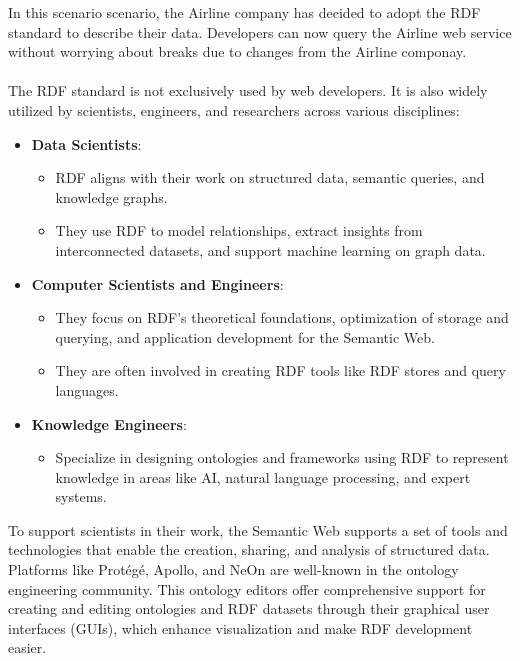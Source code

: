   In this scenario scenario, the Airline company has decided to adopt the RDF standard to describe their data.
  Developers can now query the Airline web service without worrying about breaks due to changes from the Airline componay. 
\\ 
\\
The RDF standard is not exclusively used by web developers. It is also widely utilized by scientists, engineers, and researchers across various disciplines:
\begin{itemize}
  \item \textbf{Data Scientists}:
  \begin{itemize}
      \item RDF aligns with their work on structured data, semantic queries, and knowledge graphs.
      \item They use RDF to model relationships, extract insights from interconnected datasets, and support machine learning on graph data.
  \end{itemize}
  
  \item \textbf{Computer Scientists and Engineers}:
  \begin{itemize}
      \item They focus on RDF’s theoretical foundations, optimization of storage and querying, and application development for the Semantic Web.
      \item They are often involved in creating RDF tools like RDF stores and query languages.
  \end{itemize}
  
  \item \textbf{Knowledge Engineers}:
  \begin{itemize}
      \item Specialize in designing ontologies and frameworks using RDF to represent knowledge in areas like AI, natural language processing, and expert systems.
  \end{itemize}
\end{itemize}

To support scientists in their work, the Semantic Web supports a set of tools and technologies that enable the creation, sharing, and analysis of structured data.
Platforms like Protégé, Apollo, and NeOn are well-known in the ontology engineering community. This ontology editors offer comprehensive support for creating and editing ontologies and RDF datasets through their graphical user interfaces (GUIs), which enhance visualization and make RDF development easier.

